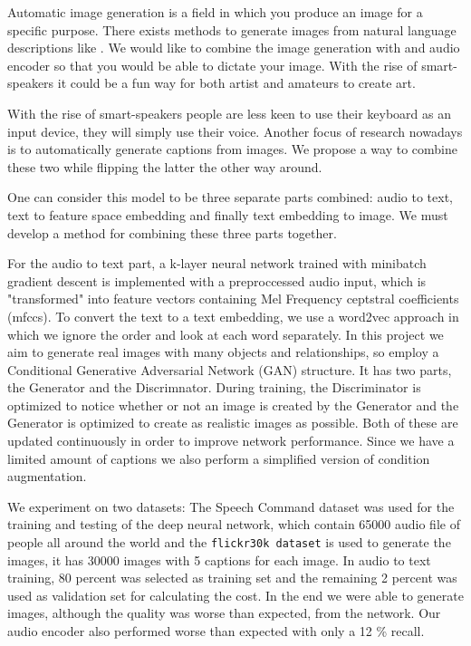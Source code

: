 \documentclass[../main.tex]{subfiles}
\begin{document}
Automatic image generation is a field in which you produce an image for a specific purpose. There exists methods to generate images from natural language descriptions like \cite{reed2016whatwhere}\cite{reed2016generative}.
We would like to combine the image generation with and audio encoder so that you would be able to dictate your image. With the rise of smart-speakers it could be a fun way for both artist and amateurs to create art.
\par
With the rise of smart-speakers people are less keen to use their keyboard as an input device, they will simply use their voice. Another focus of research nowadays is to automatically generate captions from images. We propose a way to combine these two while flipping the latter the other way around.
\par
One can consider this model to be three separate parts combined: audio to text, text to feature space embedding and finally text embedding to image. We must develop a method for combining these three parts together.
\par
For the audio to text part, a k-layer neural network trained with minibatch gradient descent is implemented with a preproccessed audio input, which is "transformed" into feature vectors containing Mel Frequency ceptstral coefficients (mfccs). To convert the text to a text embedding, we use a word2vec approach\cite{mikolov2013word2vec} in which we ignore the order and look at each word separately. In this project we aim to generate real images with many objects and relationships, so employ a Conditional  Generative Adversarial Network (GAN) structure. It has two parts, the Generator and the Discrimnator. During training, the Discriminator is optimized to notice whether or not an image is created by the Generator and the Generator is optimized to create as realistic images as possible. Both of these are updated continuously in order to improve network performance. Since we have a limited amount of captions we also perform a simplified version of condition augmentation.
\par
We experiment on two datasets: The Speech Command dataset \cite{speechcommandsv2} was used for the training and testing of the deep neural network, which contain 65000 audio file of people all around the world and the \texttt{flickr30k dataset} is used to generate the images, it has 30000 images with 5 captions for each image. In audio to text training, 80 percent was selected as training set and the remaining 2 percent was used as validation set for calculating the cost. In the end we were able to generate images, although the quality was worse than expected, from the network. Our audio encoder also performed worse than expected with only a 12 \% recall.
\end{document}
